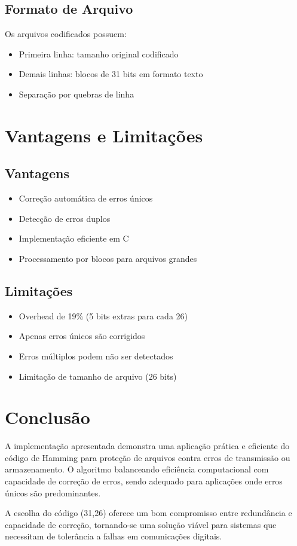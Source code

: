 \documentclass[12pt,a4paper]{article}
\begin{document}
\subsection{Formato de Arquivo}
Os arquivos codificados possuem:
\begin{itemize}
    \item Primeira linha: tamanho original codificado
    \item Demais linhas: blocos de 31 bits em formato texto
    \item Separação por quebras de linha
\end{itemize}

\section{Vantagens e Limitações}

\subsection{Vantagens}
\begin{itemize}
    \item Correção automática de erros únicos
    \item Detecção de erros duplos
    \item Implementação eficiente em C
    \item Processamento por blocos para arquivos grandes
\end{itemize}

\subsection{Limitações}
\begin{itemize}
    \item Overhead de 19\% (5 bits extras para cada 26)
    \item Apenas erros únicos são corrigidos
    \item Erros múltiplos podem não ser detectados
    \item Limitação de tamanho de arquivo (26 bits)
\end{itemize}

\section{Conclusão}

A implementação apresentada demonstra uma aplicação prática e eficiente do código de Hamming para proteção de arquivos contra erros de transmissão ou armazenamento. O algoritmo balanceando eficiência computacional com capacidade de correção de erros, sendo adequado para aplicações onde erros únicos são predominantes.

A escolha do código (31,26) oferece um bom compromisso entre redundância e capacidade de correção, tornando-se uma solução viável para sistemas que necessitam de tolerância a falhas em comunicações digitais.
\end{document}
